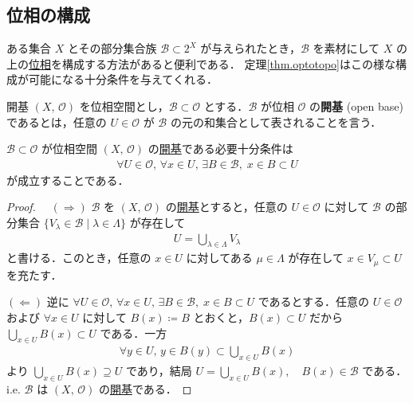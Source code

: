 \documentclass[geometry_main]{subfiles}
\begin{document}
\subsection{位相の構成}

ある集合 $X$ とその部分集合族 $\mathscr{B} \subset 2^X$ が与えられたとき，$\mathscr{B}$ を素材にして
$X$ の上の\hyperref[ax.topo]{位相}を構成する方法があると便利である．
定理\ref{thm.optotopo}はこの様な構成が可能になる十分条件を与えてくれる．

\begin{mydef}[label=def.opbase]{開基}
	$(X,\, \mathscr{O})$ を位相空間とし，$\mathscr{B} \subset \mathscr{O}$ とする．$\mathscr{B}$ が位相 $\mathscr{O}$ の\textbf{開基} (open base) であるとは，任意の $U \in \mathscr{O}$ が $\mathscr{B}$ の元の和集合として表されることを言う．
\end{mydef}

\begin{myprop}[label=prop.opbdet]{}
	$\mathscr{B} \subset \mathscr{O}$ が位相空間 $(X,\, \mathscr{O})$ の\hyperref[def.opbase]{開基}である必要十分条件は
	\begin{align}
		\forall U \in \mathscr{O},\, \forall x \in U,\, \exists B \in \mathscr{B}, \; x \in B \subset U
	\end{align}
が成立することである．
\end{myprop}
\begin{proof}
	　$(\Longrightarrow)$ $\mathscr{B}$ を $(X,\, \mathscr{O})$ の\hyperref[def.opbase]{開基}とすると，任意の $U \in \mathscr{O}$ に対して $\mathscr{B}$ の部分集合 $ \{ V_{ \lambda } \in \mathscr{B} \mid \lambda \in \Lambda \}$ が存在して
	\begin{align}
		U = \bigcup_{ \lambda \in \Lambda } V_{ \lambda }
	\end{align}
	と書ける．このとき，任意の $x \in U$ に対してある $ \mu \in \Lambda$ が存在して $x \in V_{ \mu } \subset U$ を充たす．

	$(\Longleftarrow)$ 逆に $\forall U \in \mathscr{O},\, \forall x \in U,\, \exists B \in \mathscr{B}, \; x \in B \subset U$ であるとする．任意の $U \in \mathscr{O}$ および $\forall x \in U$ に対して $B(x) \coloneqq B$ とおくと，$B(x) \subset U$ だから $ \bigcup_{x \in U} B(x) \subset  U$ である．一方
	\begin{align}
		\forall y \in U,\, y \in B(y) \subset \bigcup_{x \in U} B(x) 
	\end{align}
	より $ \bigcup_{x \in U} B(x) \supseteq U$ であり，結局 $ U = \bigcup_{x \in U} B(x),\quad B(x) \in \mathscr{B}$ である．i.e. $\mathscr{B}$ は $(X,\, \mathscr{O} )$ の\hyperref[def.opbase]{開基}である．	
\end{proof}
\end{document}
